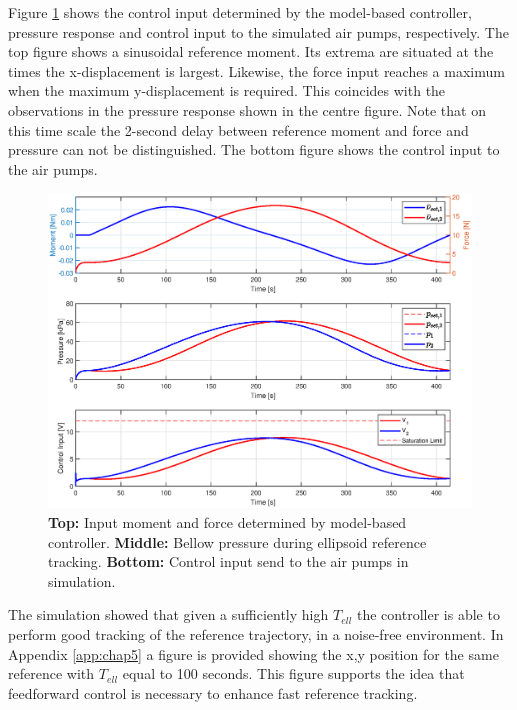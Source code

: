 Figure \ref{fig5:controlinputellipssim} shows the control input determined by the model-based controller, pressure response and control input to the simulated air pumps, respectively. The top figure shows a sinusoidal reference moment. Its extrema are situated at the times the x-displacement is largest. Likewise, the force input reaches a maximum when the maximum y-displacement is required. This coincides with the observations in the pressure response shown in the centre figure. Note that on this time scale the 2-second delay between reference moment and force and pressure can not be distinguished. The bottom figure shows the control input to the air pumps.

\newpage

\begin{figure}[H]
    \centering
    \includegraphics[width = \textwidth]{Figures/Chapter5/controlinputTell400.eps}
    \caption{\textbf{Top:} Input moment and force determined by model-based controller. \textbf{Middle:} Bellow pressure during ellipsoid reference tracking. \textbf{Bottom:} Control input send to the air pumps in simulation.}
    \label{fig5:controlinputellipssim}
\end{figure}

The simulation showed that given a sufficiently high $T_{ell}$ the controller is able to perform good tracking of the reference trajectory, in a noise-free environment. In Appendix \ref{app:chap5} a figure is provided showing the x,y position for the same reference with $T_{ell}$ equal to 100 seconds. This figure supports the idea that feedforward control is necessary to enhance fast reference tracking.

